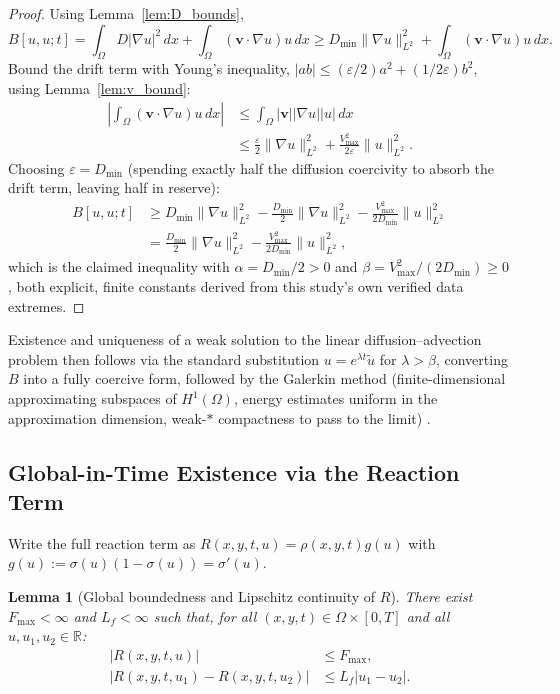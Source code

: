 \documentclass[journal]{IEEEtran}
\newtheorem{lemma}{Lemma}
\begin{document}
\begin{proof}
Using Lemma~\ref{lem:D_bounds},
\begin{equation}
B[u,u;t] = \int_\Omega D|\nabla u|^2\,dx + \int_\Omega(\mathbf{v}\cdot\nabla u)u\,dx \geq D_{\min}\|\nabla u\|^2_{L^2} + \int_\Omega(\mathbf{v}\cdot\nabla u)u\,dx.
\end{equation}
Bound the drift term with Young's inequality, $|ab|\leq(\varepsilon/2)a^2+(1/2\varepsilon)b^2$, using Lemma~\ref{lem:v_bound}:
\begin{align}
\left|\int_\Omega(\mathbf{v}\cdot\nabla u)u\,dx\right| &\leq \int_\Omega|\mathbf{v}||\nabla u||u|\,dx \nonumber\\
&\leq \frac{\varepsilon}{2}\|\nabla u\|^2_{L^2} + \frac{V_{\max}^2}{2\varepsilon}\|u\|^2_{L^2}.
\end{align}
Choosing $\varepsilon=D_{\min}$ (spending exactly half the diffusion coercivity to absorb the drift term, leaving half in reserve):
\begin{align}
B[u,u;t] &\geq D_{\min}\|\nabla u\|^2_{L^2} - \frac{D_{\min}}{2}\|\nabla u\|^2_{L^2} - \frac{V_{\max}^2}{2D_{\min}}\|u\|^2_{L^2} \nonumber\\
&= \frac{D_{\min}}{2}\|\nabla u\|^2_{L^2} - \frac{V_{\max}^2}{2D_{\min}}\|u\|^2_{L^2},
\end{align}
which is the claimed inequality with $\alpha=D_{\min}/2>0$ and $\beta=V_{\max}^2/(2D_{\min})\geq0$, both explicit, finite constants derived from this study's own verified data extremes.
\end{proof}

Existence and uniqueness of a weak solution to the linear diffusion--advection problem then follows via the standard substitution $u=e^{\lambda t}\tilde{u}$ for $\lambda>\beta$, converting $B$ into a fully coercive form, followed by the Galerkin method (finite-dimensional approximating subspaces of $H^1(\Omega)$, energy estimates uniform in the approximation dimension, weak-$*$ compactness to pass to the limit) \cite[Ch.~7]{evans2010}.

\subsection{Global-in-Time Existence via the Reaction Term}
\label{app:reaction}

Write the full reaction term as $R(x,y,t,u)=\rho(x,y,t)g(u)$ with $g(u):=\sigma(u)(1-\sigma(u))=\sigma'(u)$.

\begin{lemma}[Global boundedness and Lipschitz continuity of $R$]
\label{lem:R_bounds}
There exist $F_{\max}<\infty$ and $L_f<\infty$ such that, for all $(x,y,t)\in\Omega\times[0,T]$ and all $u,u_1,u_2\in\mathbb{R}$:
\begin{align}
|R(x,y,t,u)| &\leq F_{\max}, \\
|R(x,y,t,u_1)-R(x,y,t,u_2)| &\leq L_f|u_1-u_2|.
\end{align}
\end{lemma}
\end{document}
